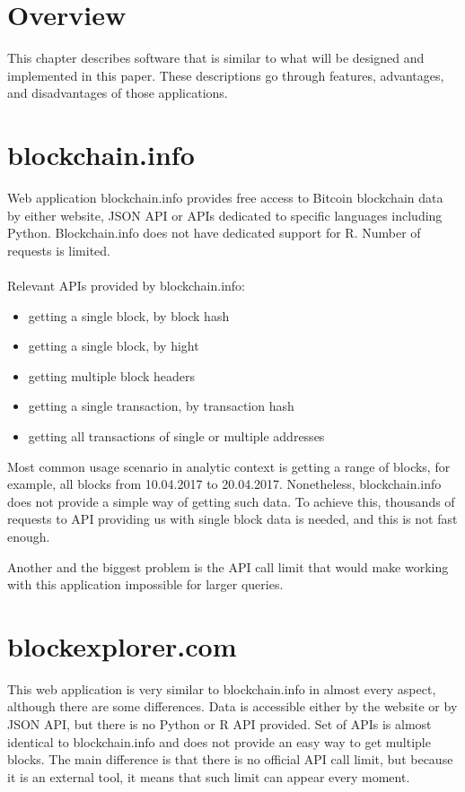 \documentclass[12pt, en, eng, twoside, final]{mgr}
\begin{document}
\section{Overview}
This chapter describes software that is similar to what will be designed and implemented in this paper. These descriptions go through features, advantages, and disadvantages of those applications. 

\section{blockchain.info}

Web application blockchain.info \cite{blokchain.info} provides free access to Bitcoin blockchain data by either website, JSON API or APIs dedicated to specific languages including Python. Blockchain.info does not have dedicated support for R. Number of requests is limited.
\\
\\
Relevant APIs provided by blockchain.info:
\begin{itemize}
\item
getting a single block, by block hash
\item
getting a single block, by hight
\item
getting multiple block headers
\item
getting a single transaction, by transaction hash
\item
getting all transactions of single or multiple addresses


\end{itemize}

Most common usage scenario in analytic context is getting a range of blocks, for example, all blocks from 10.04.2017 to 20.04.2017. Nonetheless, blockchain.info does not provide a simple way of getting such data. To achieve this, thousands of requests to API providing us with single block data is needed, and this is not fast enough.

Another and the biggest problem is the API call limit that would make working with this application impossible for larger queries.

\section{blockexplorer.com}

This web application \cite{blockexpolrer} is very similar to blockchain.info in almost every aspect, although there are some differences. Data is accessible either by the website or by JSON API, but there is no Python or R API provided. Set of APIs is almost identical to blockchain.info and does not provide an easy way to get multiple blocks. The main difference is that there is no official API call limit, but because it is an external tool, it means that such limit can appear every moment.
\end{document}
